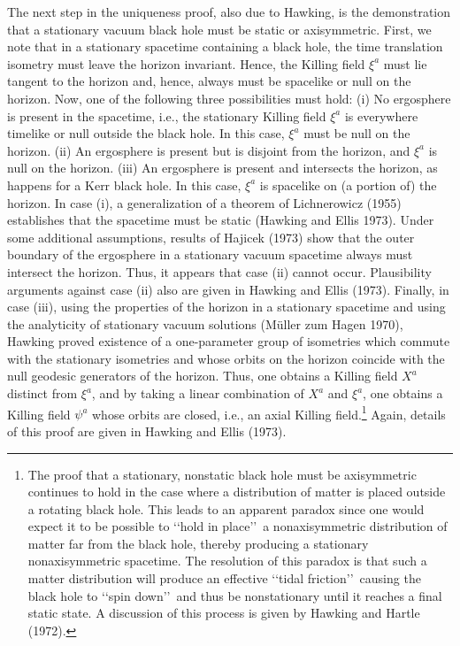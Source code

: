 The next step in the uniqueness proof, also due to Hawking, is the demonstration that
a stationary vacuum black hole must be static or axisymmetric. First, we note that in
a stationary spacetime containing a black hole, the time translation isometry must
leave the horizon invariant. Hence, the Killing field \(\xi^a\) must lie tangent to the
horizon and, hence, always must be spacelike or null on the horizon. Now, one of the
following three possibilities must hold: (i) No ergosphere is present in the spacetime,
i.e., the stationary Killing field \(\xi^a\) is everywhere timelike or null outside the
black hole. In this case, \(\xi^a\) must be null on the horizon. (ii) An ergosphere is
present but is disjoint from the horizon, and \(\xi^a\) is null on the horizon. (iii) An
ergosphere is present and intersects the horizon, as happens for a Kerr black hole.
In this case, \(\xi^a\) is spacelike on (a portion of) the horizon. In case (i), a
generalization of a theorem of Lichnerowicz (1955) establishes that the spacetime
must be static (Hawking and Ellis 1973). Under some additional assumptions,
results of Hajicek (1973) show that the outer boundary of the ergosphere in a
stationary vacuum spacetime always must intersect the horizon. Thus, it appears that
case (ii) cannot occur. Plausibility arguments against case (ii) also are given in
Hawking and Ellis (1973). Finally, in case (iii), using the properties of the horizon in
a stationary spacetime and using the analyticity of stationary vacuum solutions
(Müller zum Hagen 1970), Hawking proved existence of a one-parameter group of
isometries which commute with the stationary isometries and whose orbits on the
horizon coincide with the null geodesic generators of the horizon. Thus, one obtains a
Killing field \(X^a\) distinct from \(\xi^a\), and by taking a linear combination of
\(X^a\) and \(\xi^a\), one obtains a Killing field \(\psi^a\) whose orbits are closed,
i.e., an axial Killing field.\footnote{The proof that a stationary, nonstatic black hole
must be axisymmetric continues to hold in the case where a distribution of matter is
placed outside a rotating black hole. This leads to an apparent paradox since one would
expect it to be possible to \lq\lq hold in place\rq\rq\ a nonaxisymmetric distribution
of matter far from the black hole, thereby producing a stationary nonaxisymmetric
spacetime. The resolution of this paradox is that such a matter distribution will
produce an effective \lq\lq tidal friction\rq\rq\ causing the black hole to
\lq\lq spin down\rq\rq\ and thus be nonstationary until it reaches a final static state.
A discussion of this process is given by Hawking and Hartle (1972).} Again, details
of this proof are given in Hawking and Ellis (1973).

